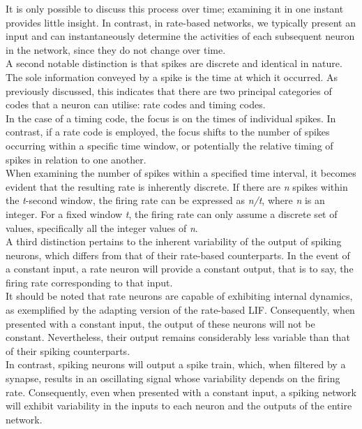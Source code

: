 \noindent It is only possible to discuss this process over time; examining it in one instant provides little insight. In contrast, in rate-based networks, we typically present an input and can instantaneously determine the activities of each subsequent neuron in the network, since they do not change over time. \\

\noindent A second notable distinction is that spikes are discrete and identical in nature. The sole information conveyed by a spike is the time at which it occurred. As previously discussed, this indicates that there are two principal categories of codes that a neuron can utilise: rate codes and timing codes. \\

\noindent In the case of a timing code, the focus is on the times of individual spikes. In contrast, if a rate code is employed, the focus shifts to the number of spikes occurring within a specific time window, or potentially the relative timing of spikes in relation to one another. \\

\noindent When examining the number of spikes within a specified time interval, it becomes evident that the resulting rate is inherently discrete. If there are \textit{n} spikes within the \textit{t}-second window, the firing rate can be expressed as \textit{n/t}, where \textit{n} is an integer. For a fixed window \textit{t}, the firing rate can only assume a discrete set of values, specifically all the integer values of \textit{n}. \\

\noindent A third distinction pertains to the inherent variability of the output of spiking neurons, which differs from that of their rate-based counterparts. In the event of a constant input, a rate neuron will provide a constant output, that is to say, the firing rate corresponding to that input. \\

\noindent It should be noted that rate neurons are capable of exhibiting internal dynamics, as exemplified by the adapting version of the rate-based LIF. Consequently, when presented with a constant input, the output of these neurons will not be constant. Nevertheless, their output remains considerably less variable than that of their spiking counterparts. \\

\noindent In contrast, spiking neurons will output a spike train, which, when filtered by a synapse, results in an oscillating signal whose variability depends on the firing rate. Consequently, even when presented with a constant input, a spiking network will exhibit variability in the inputs to each neuron and the outputs of the entire network. \\

